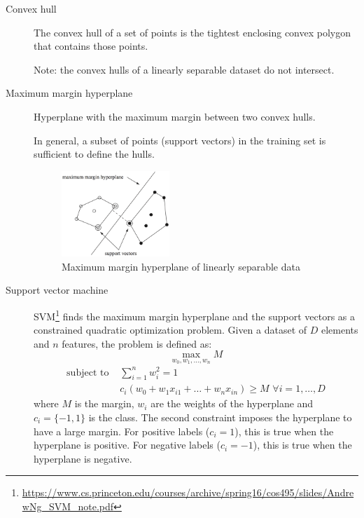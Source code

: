 \begin{description}
    \item[Convex hull]
        The convex hull of a set of points is the tightest enclosing convex polygon that contains those points.

        Note: the convex hulls of a linearly separable dataset do not intersect.

    \item[Maximum margin hyperplane] 
        Hyperplane with the maximum margin between two convex hulls.

        In general, a subset of points (support vectors)  
        in the training set is sufficient to define the hulls.

        \begin{figure}[h]
            \centering
            \includegraphics[width=0.4\textwidth]{img/svm.png}
            \caption{Maximum margin hyperplane of linearly separable data}
        \end{figure}

    \item[Support vector machine] 
        SVM\footnote{\scriptsize\url{https://www.cs.princeton.edu/courses/archive/spring16/cos495/slides/AndrewNg_SVM_note.pdf}} 
        finds the maximum margin hyperplane and the support vectors as a constrained quadratic optimization problem.
        Given a dataset of $D$ elements and $n$ features, the problem is defined as:
        \[ \max_{w_0, w_1, \dots, w_n} M \]
        \[ 
            \begin{split}
                \text{subject to }  & \sum_{i=1}^{n} w_i^2 = 1 \\
                                    & c_i(w_0 + w_1 x_{i1} + \dots + w_n x_{in}) \geq M \,\, \forall i = 1, \dots, D
            \end{split}    
        \]
        where $M$ is the margin, $w_i$ are the weights of the hyperplane and $c_i = \{-1, 1 \}$ is the class.
        The second constraint imposes the hyperplane to have a large margin. 
        For positive labels ($c_i=1$), this is true when the hyperplane is positive.
        For negative labels ($c_i=-1$), this is true when the hyperplane is negative.


\end{description}
